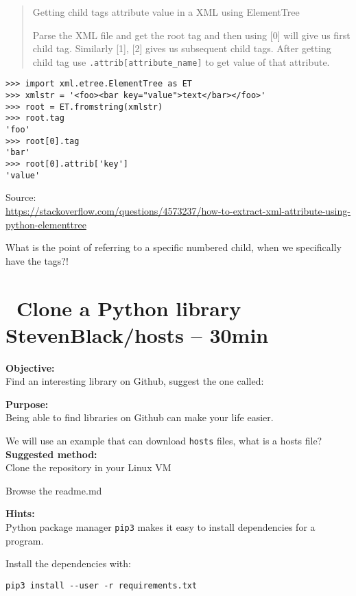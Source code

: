 \documentclass[a4paper,11pt,notitlepage]{report}
\begin{document}
\begin{quote}
Getting child tags attribute value in a XML using ElementTree

Parse the XML file and get the root tag and then using [0] will give us first child tag. Similarly [1], [2] gives us subsequent child tags. After getting child tag use \verb+.attrib[attribute_name]+ to get value of that attribute.
\end{quote}

\begin{verbatim}
>>> import xml.etree.ElementTree as ET
>>> xmlstr = '<foo><bar key="value">text</bar></foo>'
>>> root = ET.fromstring(xmlstr)
>>> root.tag
'foo'
>>> root[0].tag
'bar'
>>> root[0].attrib['key']
'value'
\end{verbatim}
Source:\\{\footnotesize \url{https://stackoverflow.com/questions/4573237/how-to-extract-xml-attribute-using-python-elementtree}}

What is the point of referring to a specific numbered child, when we specifically have the tags?!

\chapter{\faInfoCircle\ Clone a Python library StevenBlack/hosts -- 30min}
\label{ex:git-clone-XX}

{\bf Objective:}\\
Find an interesting library on Github, suggest the one called:


{\bf Purpose:}\\
Being able to find libraries on Github can make your life easier.

We will use an example that can download \verb+hosts+ files, what is a hosts file?
{\bf Suggested method:}\\
Clone the repository in your Linux VM

Browse the readme.md

{\bf Hints:}\\
Python package manager \verb+pip3+ makes it easy to install dependencies for a program.

Install the dependencies with:

\begin{verbatim}
pip3 install --user -r requirements.txt
\end{verbatim}
\end{document}
